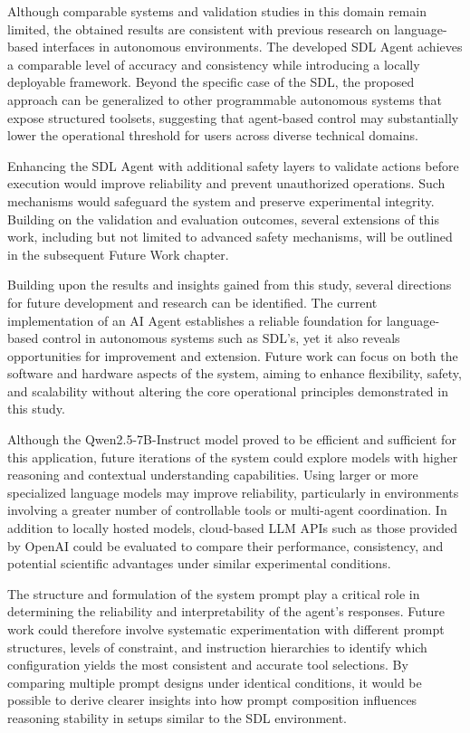 Although comparable systems and validation studies in this domain remain limited, the obtained results are consistent with previous research on language-based interfaces in autonomous environments. The developed SDL Agent achieves a comparable level of accuracy and consistency while introducing a locally deployable framework. Beyond the specific case of the SDL, the proposed approach can be generalized to other programmable autonomous systems that expose structured toolsets, suggesting that agent-based control may substantially lower the operational threshold for users across diverse technical domains.

Enhancing the SDL Agent with additional safety layers to validate actions before execution would improve reliability and prevent unauthorized operations. Such mechanisms would safeguard the system and preserve experimental integrity. Building on the validation and evaluation outcomes, several extensions of this work, including but not limited to advanced safety mechanisms, will be outlined in the subsequent Future Work chapter.


Building upon the results and insights gained from this study, several directions for future development and research can be identified. The current implementation of an AI Agent establishes a reliable foundation for language-based control in autonomous systems such as SDL's, yet it also reveals opportunities for improvement and extension. Future work can focus on both the software and hardware aspects of the system, aiming to enhance flexibility, safety, and scalability without altering the core operational principles demonstrated in this study.

Although the Qwen2.5-7B-Instruct model proved to be efficient and sufficient for this application, future iterations of the system could explore models with higher reasoning and contextual understanding capabilities. Using larger or more specialized language models may improve reliability, particularly in environments involving a greater number of controllable tools or multi-agent coordination. In addition to locally hosted models, cloud-based LLM APIs such as those provided by OpenAI could be evaluated to compare their performance, consistency, and potential scientific advantages under similar experimental conditions.

The structure and formulation of the system prompt play a critical role in determining the reliability and interpretability of the agent’s responses. Future work could therefore involve systematic experimentation with different prompt structures, levels of constraint, and instruction hierarchies to identify which configuration yields the most consistent and accurate tool selections. By comparing multiple prompt designs under identical conditions, it would be possible to derive clearer insights into how prompt composition influences reasoning stability in setups similar to the SDL environment.

